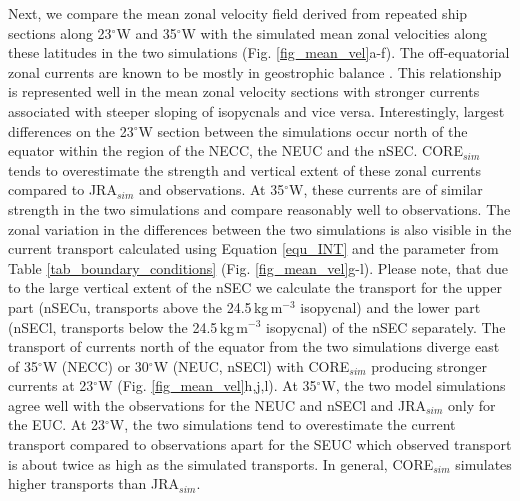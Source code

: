 \documentclass[os, manuscript]{copernicus}
\begin{document}
	Next, we compare the mean zonal velocity field derived from repeated ship sections along 23$^{\circ}$W and 35$^{\circ}$W with the simulated mean zonal velocities along these latitudes in the two simulations (Fig. \ref{fig_mean_vel}a-f). The off-equatorial zonal currents are known to be mostly in geostrophic balance \cite[e.g][]{Jochum2004,Brandt2010,Goes2013}. This relationship is represented well in the mean zonal velocity sections with stronger currents associated with steeper sloping of isopycnals and vice versa. Interestingly, largest differences on the 23$^{\circ}$W section between the simulations occur north of the equator within the region of the NECC, the NEUC and the nSEC. CORE$_{sim}$ tends to overestimate the strength and vertical extent of these zonal currents compared to JRA$_{sim}$ and observations. At 35$^{\circ}$W, these currents are of similar strength in the two simulations and compare reasonably well to observations. 
	The zonal variation in the differences between the two simulations is also visible in the current transport calculated using Equation \ref{equ_INT} and the parameter from Table \ref{tab_boundary_conditions} (Fig. \ref{fig_mean_vel}g-l). Please note, that due to the large vertical extent of the nSEC we calculate the transport for the upper part (nSECu, transports above the 24.5$\,$kg$\,$m$^{-3}$ isopycnal) and the lower part (nSECl, transports below the 24.5$\,$kg$\,$m$^{-3}$ isopycnal) of the nSEC separately. The transport of currents north of the equator from the two simulations diverge east of 35$^{\circ}$W (NECC) or 30$^{\circ}$W (NEUC, nSECl) with CORE$_{sim}$ producing stronger currents at 23$^{\circ}$W (Fig. \ref{fig_mean_vel}h,j,l). At 35$^{\circ}$W, the two model simulations agree well with the observations for the NEUC and nSECl and JRA$_{sim}$ only for the EUC. At 23$^{\circ}$W, the two simulations tend to overestimate the current transport compared to observations apart for the SEUC which observed transport is about twice as high as the simulated transports. In general, CORE$_{sim}$ simulates higher transports than JRA$_{sim}$.
	
\end{document}
